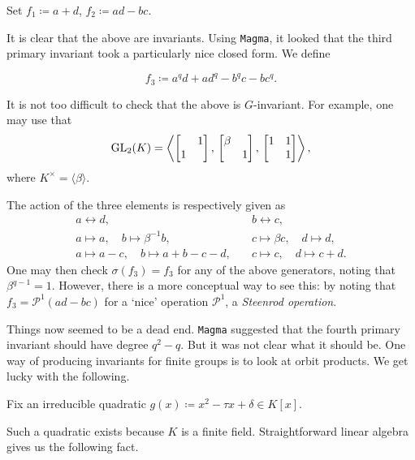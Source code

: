 \documentclass[12pt]{article}
\begin{document}
	\begin{tcolorbox}
		Set $f_{1} \coloneqq a + d$, $f_{2} \coloneqq ad - bc$.
	\end{tcolorbox}

	It is clear that the above are invariants. 
	Using \texttt{Magma}, it looked that the third primary invariant took a particularly nice closed form.
	We define
	\begin{tcolorbox}
		\begin{equation*} 
			f_{3} \coloneqq a^{q} d + a d^{q} - b^{q} c - b c^{q}.
		\end{equation*}
	\end{tcolorbox}

	It is not too difficult to check that the above is $G$-invariant. 
	For example, one may use that 
	\begin{equation} \label{eq:gens}
		\operatorname{GL}_{2}(K) = \left\langle \begin{bmatrix}  & 1 \\ 1 &  \end{bmatrix},\, \begin{bmatrix} \beta &  \\  & 1 \end{bmatrix},\, \begin{bmatrix} 1 & 1 \\  & 1 \end{bmatrix} \right\rangle,
	\end{equation}
	where $K^{\times} = \langle \beta \rangle$. 

	The action of the three elements is respectively given as
	\begin{align*} 
		a \leftrightarrow d, \quad & b \leftrightarrow c, \\
		a \mapsto a, \quad b \mapsto \beta^{-1} b, \quad & c \mapsto \beta c,\quad d \mapsto d, \\
		a \mapsto a - c, \quad b \mapsto a + b - c - d, \quad & c \mapsto c, \quad d \mapsto c + d.
	\end{align*}
	One may then check $\sigma(f_{3}) = f_{3}$ for any of the above generators, noting that $\beta^{q - 1} = 1$. 
	However, there is a more conceptual way to see this: by noting that $f_{3} = \mathcal{P}^{1}(ad - bc)$ for a `nice' operation $\mathcal{P}^{1}$, a \emph{Steenrod operation}.

	Things now seemed to be a dead end. 
	\texttt{Magma} suggested that the fourth primary invariant should have degree $q^{2} - q$. 
	But it was not clear what it should be. 
	One way of producing invariants for finite groups is to look at orbit products. 
	We get lucky with the following. 

	\begin{tcolorbox}
		Fix an irreducible quadratic $g(x) \coloneqq x^{2} - \tau x + \delta \in K[x]$. 
	\end{tcolorbox}

	Such a quadratic exists because $K$ is a finite field. Straightforward linear algebra gives us the following fact.
\end{document}
